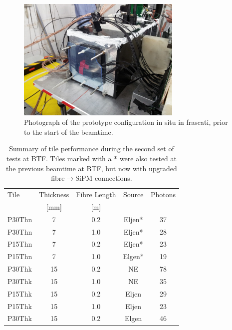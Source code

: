 \begin{figure}
	\centering
	\includegraphics[width=0.7\textwidth]{ImgChap1/frascatiphoto}
	\caption{Photograph of the prototype configuration in situ in frascati, prior to the start of the beamtime.}
	\label{Frascati2SetupPhoto}
\end{figure}

\begin{table}\centering
	\renewcommand{\arraystretch}{1.3}
	\begin{tabular}{ @{}l  c  c  c  c@{}} 
		\toprule
		Tile & Thickness &Fibre Length & Source & Photons \\
		& {\small [mm]}& {\small [m]} & & \\
		\midrule
		P30Thn & 7 & 0.2 & Eljen* & 37 \\
		P30Thn & 7 & 1.0 & Eljen* & 28 \\
		P15Thn & 7 & 0.2 & Eljen* & 23 \\
		P15Thn & 7 & 1.0 & Elgen* & 19 \\
		P30Thk & 15 & 0.2 & NE & 78 \\
		P30Thk & 15 & 1.0 & NE & 35 \\
		P15Thk & 15 & 0.2 & Eljen & 29 \\
		P15Thk & 15 & 1.0 & Eljen & 23 \\
		P30Thk & 15 & 0.2 & Elgen & 46 \\
		\bottomrule
	\end{tabular}
	\caption{Summary of tile performance during the second set of tests at BTF. Tiles marked with a * were also tested at the previous beamtime at BTF, but now with upgraded fibre$\rightarrow$SiPM connections.}
	\label{Frascati2ResultsTable}
\end{table}

